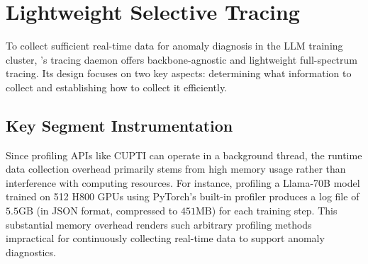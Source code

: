 \section{Lightweight Selective Tracing}
To collect sufficient real-time data for anomaly diagnosis in the LLM training cluster, \sysname{}’s tracing daemon offers backbone-agnostic and lightweight full-spectrum tracing. Its design focuses on two key aspects: determining what information to collect and establishing how to collect it efficiently.


\subsection{Key Segment Instrumentation}

Since profiling APIs like CUPTI\cite{cupti2024} can operate in a background thread, the runtime data collection overhead primarily stems from high memory usage rather than interference with computing resources. For instance, profiling a Llama-70B model trained on 512 H800 GPUs using PyTorch’s built-in profiler produces a log file of $5.5\text{GB}$ (in JSON format, compressed to $451\text{MB}$) for each training step. This substantial memory overhead renders such arbitrary profiling methods impractical for continuously collecting real-time data to support anomaly diagnostics.


